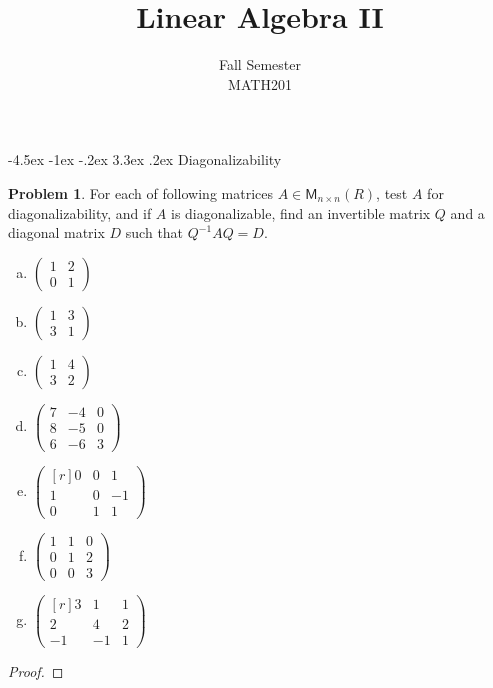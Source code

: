 \documentclass[12pt]{book}
\title{Linear Algebra II}
\author{Fall Semester\\MATH201}
\date{}
\makeatletter
\theoremstyle{definition}
\newtheorem{problem}{Problem}
\renewcommand\chapter{\@startsection {chapter}{0}{\z@}%
	{-4.5ex \@plus -1ex \@minus -.2ex}%
	{3.3ex \@plus.2ex}%
	{\normalfont\LARGE\bfseries}}
\makeatother
\begin{document}
	\setcounter{chapter}{1}
	\listoftheorems[title = Contents]
	\newpage
	\chapter{Diagonalizability}
	\begin{problem}
		For each of following matrices $A\in\mathsf{M}_{n\times n}(R)$, test $A$ for diagonalizability, and if $A$ is diagonalizable, find an invertible matrix $Q$ and a diagonal matrix $D$ such that $Q^{-1}AQ=D$.
		\begin{enumerate} [(a)]
			\item $\begin{pmatrix}
				1&2\\0&1
			\end{pmatrix}$
			\item $\begin{pmatrix}
				1&3\\3&1
			\end{pmatrix}$
			\item $\begin{pmatrix}
				1&4\\3&2
			\end{pmatrix}$
			\item $\begin{pmatrix}
				7&-4&0\\8&-5&0\\6&-6&3
			\end{pmatrix}$
			\item $\begin{pmatrix*}[r]
				0&0&1\\1&0&-1\\0&1&1
			\end{pmatrix*}$
			\item $\begin{pmatrix}
				1&1&0\\0&1&2\\0&0&3
			\end{pmatrix}$
			\item $\begin{pmatrix*}[r]
				3&1&1\\2&4&2\\-1&-1&1
			\end{pmatrix*}$
		\end{enumerate}
	\end{problem}
	\newpage
	\begin{proof}
	\end{proof}
	\newpage
\end{document}
